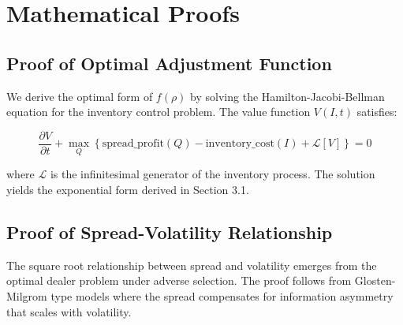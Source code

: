 \documentclass[11pt,a4paper]{article}
\theoremstyle{definition}
\begin{document}
\appendix
\section{Mathematical Proofs}

\subsection{Proof of Optimal Adjustment Function}

We derive the optimal form of $f(\rho)$ by solving the Hamilton-Jacobi-Bellman equation for the inventory control problem. The value function $V(I,t)$ satisfies:

\begin{equation}
\frac{\partial V}{\partial t} + \max_{Q} \left\{\text{spread\_profit}(Q) - \text{inventory\_cost}(I) + \mathcal{L}[V]\right\} = 0
\end{equation}

where $\mathcal{L}$ is the infinitesimal generator of the inventory process. The solution yields the exponential form derived in Section 3.1.

\subsection{Proof of Spread-Volatility Relationship}

The square root relationship between spread and volatility emerges from the optimal dealer problem under adverse selection. The proof follows from Glosten-Milgrom type models where the spread compensates for information asymmetry that scales with volatility.
\end{document}
